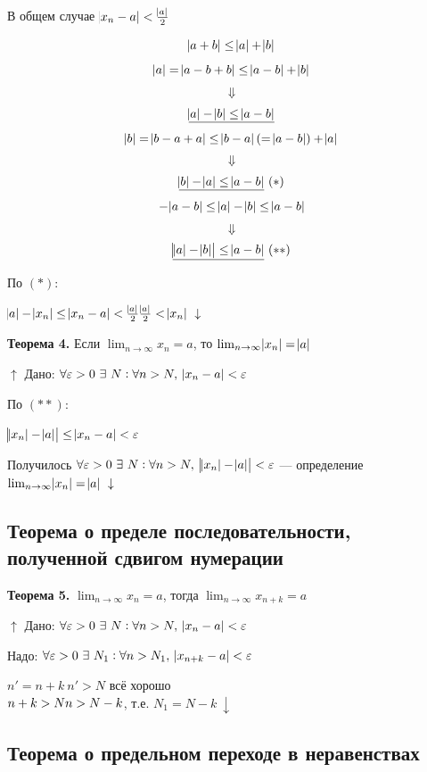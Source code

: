 \documentclass{article}
\begin{document}
    В общем случае \(\abs{x_n - a} < \frac{\abs{a}}{2}\)
    
    \[\abs{a + b} \leq \abs{a} + \abs{b}\]
    \[\abs{a} = \abs{a - b + b} \leq \abs{a - b} + \abs{b}\]
    \[\Downarrow\]
    \[\underline{\abs{a} - \abs{b} \leq \abs{a - b}}\]
    \[\abs{b} = \abs{b - a + a} \leq \abs{b - a}(= \abs{a - b}) + \abs{a}\]
    \[\Downarrow\]
    \[\underline{\abs{b} - \abs{a} \leq \abs{a - b}}\ (*)\]
    \[-\abs{a-b} \leq \abs{a} - \abs{b} \leq \abs{a - b}\]
    \[\Downarrow\]
    \[\underline{\abs{\abs{a} - \abs{b}} \leq \abs{a - b}}\ (**)\]
    
    По $(*):$

    \(\abs{a} - \abs{x_n} \leq \abs{x_n - a} < \frac{\abs{a}}{2}\\ \frac{\abs{a}}{2} < \abs{x_n}\ \downarrow\)
    
    \textbf{Теорема 4.} Если \(\lim_{n \rightarrow \infty}{x_n} = a\), то \(\lim_{n \rightarrow \infty}{\abs{x_n}} = \abs{a}\)
    
    \(\uparrow\) Дано: \(\forall \varepsilon > 0\ \exists\ N : \forall n > N,\ \abs{x_n - a} < \varepsilon\)
    
    По $(**):$

    \(\abs{\abs{x_n} - \abs{a}} \leq \abs{x_n - a} < \varepsilon\)
    
    Получилось \(\forall \varepsilon > 0\ \exists\ N : \forall n > N,\ \abs{\abs{x_n} - \abs{a}} < \varepsilon\) --- определение \(\lim_{n \rightarrow \infty}{\abs{x_n}} = \abs{a}\ \downarrow\)

    \subsection{Теорема о пределе последовательности, полученной сдвигом нумерации}
    
    \textbf{Теорема 5.} \(\lim_{n \rightarrow \infty}{x_n} = a\), тогда \(\lim_{n \rightarrow \infty}{x_{n+k}} = a\)
    
    \(\uparrow\) Дано: \(\forall \varepsilon > 0\ \exists\ N : \forall n > N,\ \abs{x_n - a} < \varepsilon\)
    
    Надо: \(\forall \varepsilon > 0\ \exists\ N_1 : \forall n > N_1,\ \abs{x_{n+k} - a} < \varepsilon\)
    
    \(n' = n + k\ n' > N\) всё хорошо
    \\ \(n + k > N\\ n > N - k\), т.е. \(N_1 = N - k\ \downarrow\)
    
    \subsection{Теорема о предельном переходе в неравенствах}
    
\end{document}
